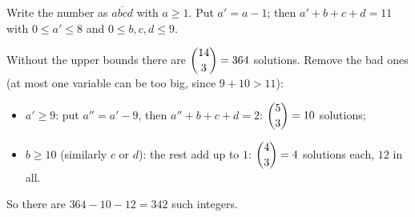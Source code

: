 Write the number as $\overline{abcd}$ with $a\ge1$. Put $a'=a-1$; then $a'+b+c+d=11$ with $0\le a'\le8$ and $0\le b,c,d\le9$.

Without the upper bounds there are $\dbinom{14}{3}=364$ solutions. Remove the bad ones (at most one variable can be too big, since $9+10>11$):
\begin{itemize}
\item $a'\ge9$: put $a''=a'-9$, then $a''+b+c+d=2$: $\dbinom53=10$ solutions;
\item $b\ge10$ (similarly $c$ or $d$): the rest add up to $1$: $\dbinom43=4$ solutions each, $12$ in all.
\end{itemize}
So there are $364-10-12=\boxed{342}$ such integers.
